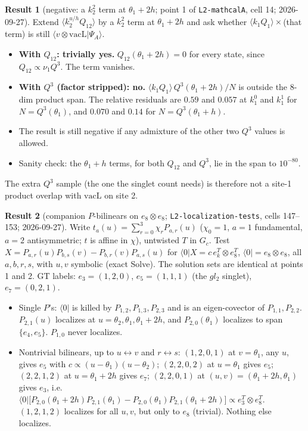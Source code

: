 \documentclass[11pt]{article}
\newcommand{\nb}[1]{\texttt{#1}}
\theoremstyle{definition}
\newtheorem{result}{Result}
\theoremstyle{remark}
\begin{document}
\begin{result}[negative: a $k_2^2$ term at $\theta_1+2h$; point 1 of \nb{L2-mathcalA}, cell 14; 2026-09-27]
Extend $\langle k_2^{u/h}Q_{12}\rangle$ by a $k_2^2$ term at $\theta_1+2h$ and ask whether $\langle k_1Q_1\rangle\times$(that term) is still $\langle v\otimes\mathrm{vacL}|\Psi_A\rangle$.
\begin{itemize}
\item \textbf{With $Q_{12}$: trivially yes.} $Q_{12}(\theta_1+2h)=0$ for every state, since $Q_{12}\propto\nu_1Q^3$. The term vanishes.
\item \textbf{With $Q^3$ (factor stripped): no.} $\langle k_1Q_1\rangle\,Q^3(\theta_1+2h)/N$ is outside the 8-dim product span. The relative residuals are $0.59$ and $0.057$ at $k_1^0$ and $k_1^1$ for $N=Q^3(\theta_1)$, and $0.070$ and $0.14$ for $N=Q^3(\theta_1+h)$.
\item The result is still negative if any admixture of the other two $Q^3$ values is allowed.
\item Sanity check: the $\theta_1+h$ terms, for both $Q_{12}$ and $Q^3$, lie in the span to $10^{-80}$.
\end{itemize}
The extra $Q^3$ sample (the one the singlet count needs) is therefore not a site-1 product overlap with $\mathrm{vacL}$ on site 2.
\end{result}

\begin{result}[companion $P$-bilinears on $e_8\otimes e_8$; \nb{L2-localization-tests}, cells 147--153; 2026-09-27]
Write $t_a(u)=\sum_{r=0}^3\chi_rP_{a,r}(u)$ ($\chi_0=1$, $a=1$ fundamental, $a=2$ antisymmetric; $t$ is affine in $\chi$), untwisted $T$ in $G_c$. Test $X=P_{a,r}(u)P_{b,s}(v)-P_{b,r}(v)P_{a,s}(u)$ for $\langle0|X=c\,e_k^T\otimes e_8^T$, $\langle0|=e_8\otimes e_8$, all $a,b,r,s$, with $u,v$ symbolic (exact Solve). The solution sets are identical at points 1 and 2. GT labels: $e_3=(1,2,0)$, $e_5=(1,1,1)$ (the $gl_2$ singlet), $e_7=(0,2,1)$.
\begin{itemize}
\item Single $P$'s: $\langle0|$ is killed by $P_{1,2},P_{1,3},P_{2,3}$ and is an eigen-covector of $P_{1,1},P_{2,2}$. $P_{2,1}(u)$ localizes at $u=\theta_2,\theta_1,\theta_1+2h$, and $P_{2,0}(\theta_1)$ localizes to span$\{e_4,e_5\}$. $P_{1,0}$ never localizes.
\item Nontrivial bilinears, up to $u\leftrightarrow v$ and $r\leftrightarrow s$:
$(1,2,0,1)$ at $v=\theta_1$, any $u$, gives $e_5$ with $c\propto(u-\theta_1)(u-\theta_2)$;
$(2,2,0,2)$ at $u=\theta_1$ gives $e_5$;
$(2,2,1,2)$ at $u=\theta_1+2h$ gives $e_7$;
$(2,2,0,1)$ at $(u,v)=(\theta_1+2h,\theta_1)$ gives $e_3$, i.e.\ $\langle0|\big[P_{2,0}(\theta_1{+}2h)P_{2,1}(\theta_1)-P_{2,0}(\theta_1)P_{2,1}(\theta_1{+}2h)\big]\propto e_3^T\otimes e_8^T$.
$(1,2,1,2)$ localizes for all $u,v$, but only to $e_8$ (trivial). Nothing else localizes.
\end{itemize}
\end{result}
\end{document}
